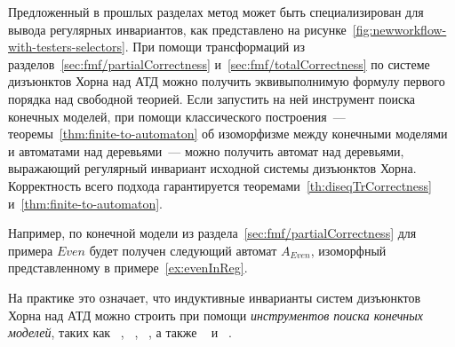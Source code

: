 \newworkflowWithTestersAndSelectors{}

Предложенный в прошлых разделах метод может быть специализирован для вывода регулярных инвариантов, как представлено на рисунке~\cref{fig:newworkflow-with-testers-selectors}.
При помощи трансформаций из разделов~\cref{sec:fmf/partialCorrectness} и~\cref{sec:fmf/totalCorrectness} по системе дизъюнктов Хорна над АТД можно получить эквивыполнимую формулу первого порядка над свободной теорией.
Если запустить на ней инструмент поиска конечных моделей, при помощи классического построения~---
теоремы~\ref{thm:finite-to-automaton} об изоморфизме между конечными моделями и автоматами над деревьями~--- можно получить автомат над деревьями, выражающий регулярный инвариант исходной системы дизъюнктов Хорна.
Корректность всего подхода гарантируется теоремами~\ref{th:diseqTrCorrectness} и~\ref{thm:finite-to-automaton}.

Например, по конечной модели из раздела~\cref{sec:fmf/partialCorrectness} для примера $ Even $ будет получен следующий автомат $ A _{Even} $, изоморфный представленному в примере~\ref{ex:evenInReg}.
\exampleCostruction

На практике это означает, что индуктивные инварианты систем дизъюнктов Хорна над АТД можно строить при помощи \emph{инструментов поиска конечных моделей}, таких как \mace{}~\cite{https://doi.org/10.48550/arxiv.cs/0310055}, \kodkod{}~\cite{10.1007/978-3-540-71209-1_49}, \paradox{}~\cite{claessen2003new}, а также \cvc{}~\cite{reynolds2013finite} и \vampire{}~\cite{10.1007/978-3-319-40970-2_20}.

